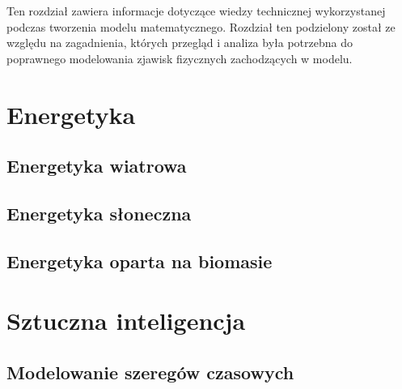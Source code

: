 
Ten rozdział zawiera informacje dotyczące wiedzy technicznej wykorzystanej podczas tworzenia modelu matematycznego.
Rozdział ten podzielony został ze względu na zagadnienia, których przegląd i analiza była potrzebna
do poprawnego modelowania zjawisk fizycznych zachodzących w modelu. 

\section{Energetyka}


\subsection{Energetyka wiatrowa}

\subsection{Energetyka słoneczna}

\subsection{Energetyka oparta na biomasie}


\section{Sztuczna inteligencja}

\subsection{Modelowanie szeregów czasowych}
